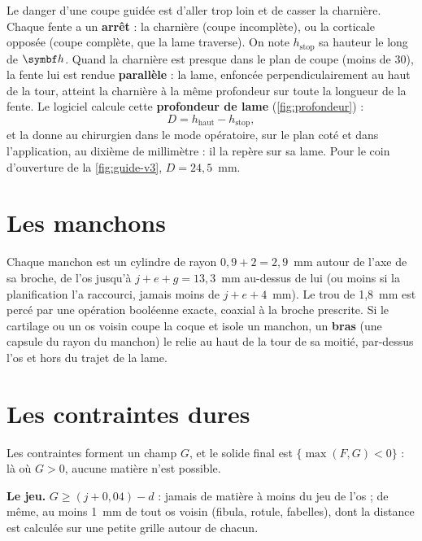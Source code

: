Le danger d'une coupe guidée est d'aller trop loin et de casser la charnière. Chaque fente a un \textbf{arrêt} : la
charnière (coupe incomplète), ou la corticale opposée (coupe complète, que la lame traverse). On note $h_{\text{stop}}$
sa hauteur le long de $\vb{h}$. Quand la charnière est presque dans le plan de coupe (moins de 30\degre), la fente lui
est rendue \textbf{parallèle} : la lame, enfoncée perpendiculairement au haut de la tour, atteint la charnière à la même
profondeur sur toute la longueur de la fente. Le logiciel calcule cette \textbf{profondeur de lame}
(\cref{fig:profondeur}) :
\begin{equation}
  D = h_{\text{haut}} - h_{\text{stop}},
\end{equation}
et la donne au chirurgien dans le mode opératoire, sur le plan coté et dans l'application, au dixième de millimètre :
il la repère sur sa lame. Pour le coin d'ouverture de la \cref{fig:guide-v3}, $D = 24{,}5$~mm.


\section{Les manchons}

Chaque manchon est un cylindre de rayon $0{,}9 + 2 = 2{,}9$~mm autour de l'axe de sa broche, de l'os jusqu'à
$j + e + g = 13{,}3$~mm au-dessus de lui (ou moins si la planification l'a raccourci, jamais moins de $j + e + 4$~mm).
Le trou de 1,8~mm est percé par une opération booléenne exacte, coaxial à la broche prescrite. Si le cartilage ou un os
voisin coupe la coque et isole un manchon, un \textbf{bras} (une capsule du rayon du manchon) le relie au haut de la
tour de sa moitié, par-dessus l'os et hors du trajet de la lame.

\section{Les contraintes dures}
\label{sec:contraintes-dures}

Les contraintes forment un champ $G$, et le solide final est $\{\max(F, G) < 0\}$ : là où $G > 0$, aucune matière n'est
possible.

\textbf{Le jeu.} $G \geq (j + 0{,}04) - d$ : jamais de matière à moins du jeu de l'os ; de même, au moins 1~mm de tout
os voisin (fibula, rotule, fabelles), dont la distance est calculée sur une petite grille autour de chacun.

